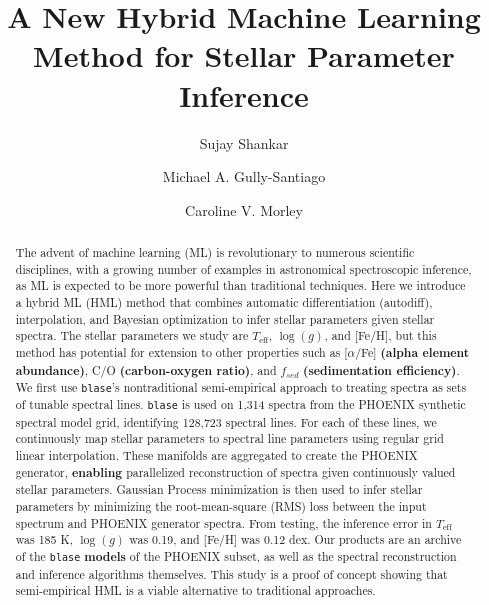 \documentclass[twocolumn, linenumbers]{aastex631}
\begin{document}
\title{A New Hybrid Machine Learning Method for Stellar Parameter Inference}
\author[0000-0002-2290-6810]{Sujay Shankar}
\author[0000-0002-4020-3457]{Michael A. Gully-Santiago}
\author[0000-0002-4404-0456]{Caroline V. Morley}


\begin{abstract}
    The advent of machine learning (ML) is revolutionary to numerous scientific disciplines, with a growing number of examples in astronomical spectroscopic inference, as ML is expected to be more powerful than traditional techniques.
    Here we introduce a hybrid ML (HML) method that combines automatic differentiation (autodiff), interpolation, and Bayesian optimization to infer stellar parameters given stellar spectra.
    The stellar parameters we study are $T_{\mathrm{eff}}$, $\log(g)$, and [Fe/H], but this method has potential for extension to other properties such as [$\alpha$/Fe] \textbf{(alpha element abundance)}, C/O \textbf{(carbon-oxygen ratio)}, and $f_{sed}$ \textbf{(sedimentation efficiency)}.
    We first use \texttt{blase}'s nontraditional semi-empirical approach to treating spectra as sets of tunable spectral lines.
    \texttt{blase} is used on 1,314 spectra from the PHOENIX synthetic spectral model grid, identifying 128,723 spectral lines.
    For each of these lines, we continuously map stellar parameters to spectral line parameters using regular grid linear interpolation.
    These manifolds are aggregated to create the PHOENIX generator, \textbf{enabling} parallelized reconstruction of spectra given continuously valued stellar parameters.
    Gaussian Process minimization is then used to infer stellar parameters by minimizing the root-mean-square (RMS) loss between the input spectrum and PHOENIX generator spectra.
    From testing, the inference error in $T_{\mathrm{eff}}$ was 185 K, $\log(g)$ was 0.19, and [Fe/H] was 0.12 dex.
    Our products are an archive of the \texttt{blase} \textbf{models} of the PHOENIX subset, as well as the spectral reconstruction and inference algorithms themselves.
    This study is a proof of concept showing that semi-empirical HML is a viable alternative to traditional approaches.
\end{abstract}
\end{document}
